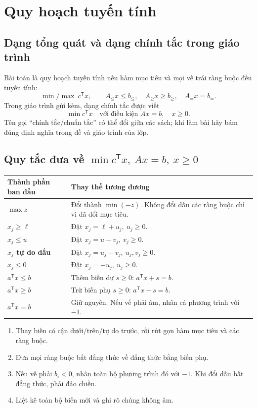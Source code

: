\documentclass[11pt,a4paper]{article}
\newcommand{\T}{^{\mathsf T}}
\begin{document}
\section{Quy hoạch tuyến tính}
\subsection{Dạng tổng quát và dạng chính tắc trong giáo trình}
Bài toán là quy hoạch tuyến tính nếu hàm mục tiêu và mọi vế trái ràng buộc đều tuyến tính:
\[
\min/\max\ c\T x,\qquad
A_{\le}x\le b_{\le},\quad A_{\ge}x\ge b_{\ge},\quad A_=x=b_=.
\]
Trong giáo trình gửi kèm, dạng chính tắc được viết
\[
\boxed{\min c\T x\quad\text{với điều kiện }Ax=b,\quad x\ge0.}
\]
Tên gọi “chính tắc/chuẩn tắc” có thể đổi giữa các sách; khi làm bài hãy bám đúng định nghĩa trong đề và giáo trình của lớp.

\subsection{Quy tắc đưa về \(\min c\T x,\ Ax=b,\ x\ge0\)}
\begin{center}
\begin{tabularx}{.96\textwidth}{>{\bfseries}p{}Y}
\toprule
Thành phần ban đầu & Thay thế tương đương\\
\midrule
\(\max z\) & Đổi thành \(\min(-z)\). Không đổi dấu các ràng buộc chỉ vì đã đổi mục tiêu.\\
\(x_j\ge \ell\) & Đặt \(x_j=\ell+u_j,\ u_j\ge0\).\\
\(x_j\le u\) & Đặt \(x_j=u-v_j,\ v_j\ge0\).\\
\(x_j\) tự do dấu & Đặt \(x_j=u_j-v_j,\ u_j,v_j\ge0\).\\
\(x_j\le0\) & Đặt \(x_j=-u_j,\ u_j\ge0\).\\
\(a\T x\le b\) & Thêm biến dư \(s\ge0\): \(a\T x+s=b\).\\
\(a\T x\ge b\) & Trừ biến phụ \(s\ge0\): \(a\T x-s=b\).\\
\(a\T x=b\) & Giữ nguyên. Nếu vế phải âm, nhân cả phương trình với \(-1\).\\
\bottomrule
\end{tabularx}
\end{center}

\begin{enumerate}
\item Thay biến có cận dưới/trên/tự do trước, rồi rút gọn hàm mục tiêu và các ràng buộc.
\item Đưa mọi ràng buộc bất đẳng thức về đẳng thức bằng biến phụ.
\item Nếu vế phải \(b_i<0\), nhân toàn bộ phương trình đó với \(-1\). Khi đổi dấu bất đẳng thức, phải đảo chiều.
\item Liệt kê toàn bộ biến mới và ghi rõ chúng không âm.
\end{enumerate}
\end{document}

